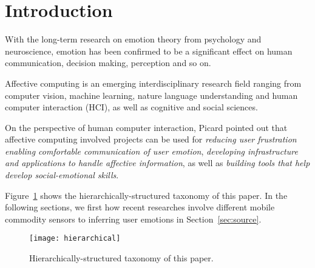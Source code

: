 \section{Introduction}\label{sec:intro}

With the long-term research on emotion theory from psychology and neuroscience\cite{james1884emotion, turkle2005second}, emotion has been confirmed to be a significant effect \cite{james2013emotion} on human communication, decision making, perception and so on.

Affective computing is an emerging interdisciplinary research field ranging from computer vision, machine learning, nature language understanding and human computer interaction (HCI), as well as cognitive and social sciences.

On the perspective of human computer interaction, Picard \cite{Picard1999} pointed out that affective computing involved projects can be used for \emph{reducing user frustration enabling comfortable communication of user emotion}, \emph{developing infrastructure and applications to handle affective information}, as well as \emph{building tools that help develop social-emotional skills}.




Figure~\ref{fig:hierarchically} shows the hierarchically-structured taxonomy of this paper.
In the following sections, we first  how recent researches involve different mobile commodity sensors to inferring user emotions in Section~\ref{sec:source}. 

\begin{figure}[H]
    \centering
    \texttt{[image: hierarchical]}
    \caption{Hierarchically-structured taxonomy of this paper.}
    \label{fig:hierarchically}
\end{figure}